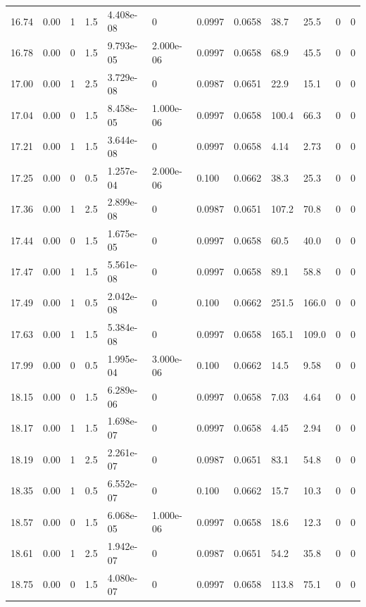 \documentclass[preview]{standalone}
\begin{document}
{{{{\begin{tabular}{L{1.2cm}C{1.2cm} C{0.3cm}C{0.5cm} C{1.4cm}C{1.4cm} C{1.4cm}C{1.4cm} C{1.6cm}C{1.6cm} C{1.6cm}C{1.6cm}}
  16.74  &  0.00  & 1     & 1.5 &  4.408e-08  & 0  &  0.0997&   0.0658& 38.7 & 25.5   &  0 & 0  \\ 
  16.78  &  0.00  & 0     & 1.5 &  9.793e-05  & 2.000e-06  &  0.0997&   0.0658& 68.9 & 45.5   &  0 & 0  \\ 
  17.00  &  0.00  & 1     & 2.5 &  3.729e-08  & 0  &  0.0987&   0.0651& 22.9 & 15.1   &  0 & 0  \\ 
  17.04  &  0.00  & 0     & 1.5 &  8.458e-05  & 1.000e-06  &  0.0997&   0.0658& 100.4 & 66.3   &  0 & 0  \\ 
  17.21  &  0.00  & 1     & 1.5 &  3.644e-08  & 0  &  0.0997&   0.0658& 4.14 & 2.73   &  0 & 0  \\ 
  17.25  &  0.00  & 0     & 0.5 &  1.257e-04  & 2.000e-06  &  0.100&   0.0662& 38.3 & 25.3   &  0 & 0  \\ 
  17.36  &  0.00  & 1     & 2.5 &  2.899e-08  & 0  &  0.0987&   0.0651& 107.2 & 70.8   &  0 & 0  \\ 
  17.44  &  0.00  & 0     & 1.5 &  1.675e-05  & 0  &  0.0997&   0.0658& 60.5 & 40.0   &  0 & 0  \\ 
  17.47  &  0.00  & 1     & 1.5 &  5.561e-08  & 0  &  0.0997&   0.0658& 89.1 & 58.8   &  0 & 0  \\ 
  17.49  &  0.00  & 1     & 0.5 &  2.042e-08  & 0  &  0.100&   0.0662& 251.5 & 166.0   &  0 & 0  \\ 
  17.63  &  0.00  & 1     & 1.5 &  5.384e-08  & 0  &  0.0997&   0.0658& 165.1 & 109.0   &  0 & 0  \\ 
  17.99  &  0.00  & 0     & 0.5 &  1.995e-04  & 3.000e-06  &  0.100&   0.0662& 14.5 & 9.58   &  0 & 0  \\ 
  18.15  &  0.00  & 0     & 1.5 &  6.289e-06  & 0  &  0.0997&   0.0658& 7.03 & 4.64   &  0 & 0  \\ 
  18.17  &  0.00  & 1     & 1.5 &  1.698e-07  & 0  &  0.0997&   0.0658& 4.45 & 2.94   &  0 & 0  \\ 
  18.19  &  0.00  & 1     & 2.5 &  2.261e-07  & 0  &  0.0987&   0.0651& 83.1 & 54.8   &  0 & 0  \\ 
  18.35  &  0.00  & 1     & 0.5 &  6.552e-07  & 0  &  0.100&   0.0662& 15.7 & 10.3   &  0 & 0  \\ 
  18.57  &  0.00  & 0     & 1.5 &  6.068e-05  & 1.000e-06  &  0.0997&   0.0658& 18.6 & 12.3   &  0 & 0  \\ 
  18.61  &  0.00  & 1     & 2.5 &  1.942e-07  & 0  &  0.0987&   0.0651& 54.2 & 35.8   &  0 & 0  \\ 
  18.75  &  0.00  & 0     & 1.5 &  4.080e-07  & 0  &  0.0997&   0.0658& 113.8 & 75.1   &  0 & 0  \\ 

\end{tabular}}}}}
\end{document}
